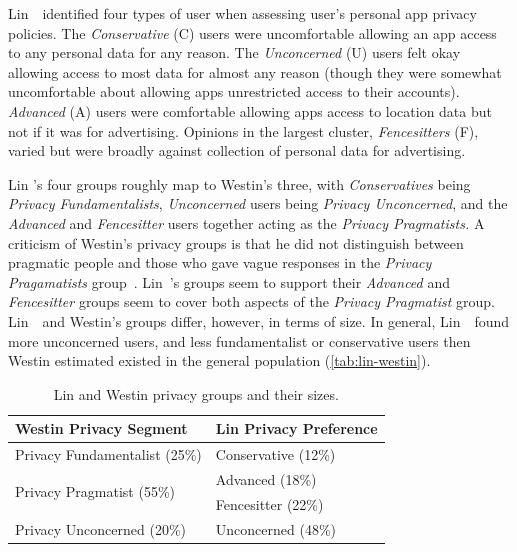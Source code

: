 \documentclass[thesis.tex]{subfiles}
\begin{document}
Lin~\etal~identified four types of user when assessing user's personal app
privacy policies.  The \emph{Conservative} (C) users were uncomfortable
allowing an app access to any personal data for any reason.  The
\emph{Unconcerned} (U) users felt okay allowing access to most data for almost
any reason (though they were somewhat uncomfortable about allowing apps
unrestricted access to their accounts).  \emph{Advanced} (A) users were
comfortable allowing apps access to location data but not if it was for
advertising.  Opinions in the largest cluster, \emph{Fencesitters} (F), varied
but were broadly against collection of personal data for advertising.

Lin \etal's four groups roughly map to Westin's three, with
\emph{Conservatives} being \emph{Privacy Fundamentalists},
\emph{Unconcerned} users being \emph{Privacy Unconcerned}, and the
\emph{Advanced} and \emph{Fencesitter} users together acting as the
\emph{Privacy Pragmatists.}  A criticism of Westin's privacy groups is
that he did not distinguish between pragmatic people and those who
gave vague responses in the \emph{Privacy Pragamatists}
group~\cite{urban_privacy_2014}. Lin~\etal's groups seem to support
their \emph{Advanced} and \emph{Fencesitter} groups seem to cover both
aspects of the \emph{Privacy Pragmatist} group.  Lin~\etal~and
Westin's groups differ, however, in terms of size.  In general,
Lin~\etal~found more unconcerned users, and less fundamentalist or
conservative users then Westin estimated existed in the general
population (\autoref{tab:lin-westin}).

\begin{table}
  \centering\sffamily\footnotesize
  \begin{tabular}{ll}
    \toprule
    \textbf{Westin Privacy Segment}            & \textbf{Lin \etal{} Privacy Preference} \\
    \midrule
    Privacy Fundamentalist (25\%)              & Conservative (12\%)                     \\
    \midrule
    \multirow{2}{*}{Privacy Pragmatist (55\%)} & Advanced (18\%)                         \\
                                               & Fencesitter (22\%)                      \\
    \midrule
    Privacy Unconcerned (20\%)                 & Unconcerned (48\%)                      \\
    \bottomrule
  \end{tabular}
  \caption{Lin and Westin privacy groups and their sizes.}
  \label{tab:lin-westin}
\end{table}
\end{document}
